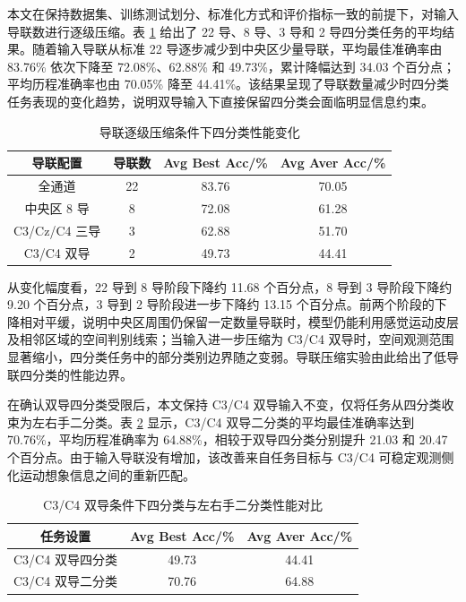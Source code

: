 本文在保持数据集、训练测试划分、标准化方式和评价指标一致的前提下，对输入导联数进行逐级压缩。表 \ref{tab:channel_degradation} 给出了 22 导、8 导、3 导和 2 导四分类任务的平均结果。随着输入导联从标准 22 导逐步减少到中央区少量导联，平均最佳准确率由 83.76\% 依次下降至 72.08\%、62.88\% 和 49.73\%，累计降幅达到 34.03 个百分点；平均历程准确率也由 70.05\% 降至 44.41\%。该结果呈现了导联数量减少时四分类任务表现的变化趋势，说明双导输入下直接保留四分类会面临明显信息约束。

\begin{table}[htbp]
    \centering
    \caption{导联逐级压缩条件下四分类性能变化}
    \label{tab:channel_degradation}
    \begin{tabular}{cccc}
        \hline
        导联配置 & 导联数 & Avg Best Acc/\% & Avg Aver Acc/\% \\
        \hline
        全通道 & 22 & 83.76 & 70.05 \\
        中央区 8 导 & 8 & 72.08 & 61.28 \\
        C3/Cz/C4 三导 & 3 & 62.88 & 51.70 \\
        C3/C4 双导 & 2 & 49.73 & 44.41 \\
        \hline
    \end{tabular}
\end{table}

从变化幅度看，22 导到 8 导阶段下降约 11.68 个百分点，8 导到 3 导阶段下降约 9.20 个百分点，3 导到 2 导阶段进一步下降约 13.15 个百分点。前两个阶段的下降相对平缓，说明中央区周围仍保留一定数量导联时，模型仍能利用感觉运动皮层及相邻区域的空间判别线索；当输入进一步压缩为 C3/C4 双导时，空间观测范围显著缩小，四分类任务中的部分类别边界随之变弱。导联压缩实验由此给出了低导联四分类的性能边界。

在确认双导四分类受限后，本文保持 C3/C4 双导输入不变，仅将任务从四分类收束为左右手二分类。表 \ref{tab:c3c4_task_redefine} 显示，C3/C4 双导二分类的平均最佳准确率达到 70.76\%，平均历程准确率为 64.88\%，相较于双导四分类分别提升 21.03 和 20.47 个百分点。由于输入导联没有增加，该改善来自任务目标与 C3/C4 可稳定观测侧化运动想象信息之间的重新匹配。

\begin{table}[htbp]
    \centering
    \caption{C3/C4 双导条件下四分类与左右手二分类性能对比}
    \label{tab:c3c4_task_redefine}
    \begin{tabular}{ccc}
        \hline
        任务设置 & Avg Best Acc/\% & Avg Aver Acc/\% \\
        \hline
        C3/C4 双导四分类 & 49.73 & 44.41 \\
        C3/C4 双导二分类 & 70.76 & 64.88 \\
        \hline
    \end{tabular}
\end{table}

